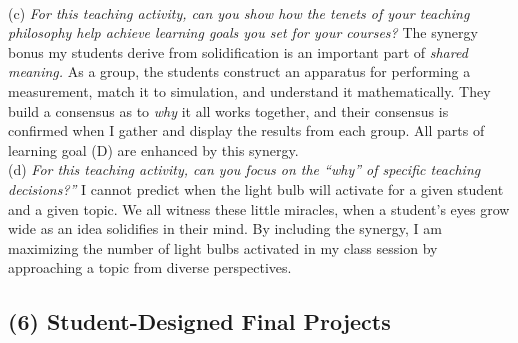 \documentclass[../../../main.tex]{subfiles}
\begin{document}
\\
\vspace{0.25cm}
(c) \textit{For this teaching activity, can you show how the tenets of your teaching philosophy help achieve learning goals you set for your courses?}  The synergy bonus my students derive from solidification is an important part of \textit{shared meaning.}  As a group, the students construct an apparatus for performing a measurement, match it to simulation, and understand it mathematically.  They build a consensus as to \textit{why} it all works together, and their consensus is confirmed when I gather and display the results from each group.  All parts of learning goal (D) are enhanced by this synergy.
\\
\vspace{0.25cm}
(d) \textit{For this teaching activity, can you focus on the ``why'' of specific teaching decisions?''} I cannot predict when the light bulb will activate for a given student and a given topic.  We all witness these little miracles, when a student's eyes grow wide as an idea solidifies in their mind.  By including the synergy, I am maximizing the number of light bulbs activated in my class session by approaching a topic from diverse perspectives.

\subsection{(6) Student-Designed Final Projects}
\end{document}
